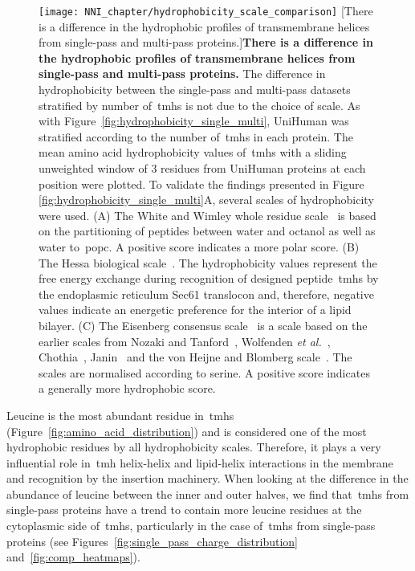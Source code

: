 \begin{figure}[!ht]
\centering
\texttt{[image: NNI\_chapter/hydrophobicity\_scale\_comparison]}
[There is a difference in the hydrophobic profiles of transmembrane helices from single\--pass and multi\--pass proteins.]{\textbf{There is a difference in the hydrophobic profiles of transmembrane helices from single\--pass and multi\--pass proteins.}
The difference in hydrophobicity between the single\--pass and multi\--pass datasets stratified by number of~\gls{tmh}s is not due to the choice of scale.
As with Figure~\ref{fig:hydrophobicity_single_multi}, UniHuman was stratified according to the number of~\gls{tmh}s in each protein.
The mean amino acid hydrophobicity values of~\gls{tmh}s with a sliding unweighted window of 3 residues from UniHuman proteins at each position were plotted.
To validate the findings presented in Figure \ref{fig:hydrophobicity_single_multi}A, several scales of hydrophobicity were used.
(A) The White and Wimley whole residue scale~\cite{White1999} is based on the partitioning of peptides between water and octanol as well as water to~\gls{popc}.
A positive score indicates a more polar score.
(B) The Hessa biological scale~\cite{Hessa2005}.
The hydrophobicity values represent the free energy exchange during recognition of designed peptide~\gls{tmh}s by the endoplasmic reticulum Sec61 translocon and, therefore, negative values indicate an energetic preference for the interior of a lipid bilayer.
(C) The Eisenberg consensus scale~\cite{Eisenberg1984} is a scale based on the earlier scales from Nozaki and Tanford~\cite{Nozaki1971}, Wolfenden \textit{et al.}~\cite{Wolfenden1981}, Chothia~\cite{Chothia1976}, Janin~\cite{Janin1979} and the von Heijne and Blomberg scale~\cite{VonHeijne1979}.
The scales are normalised according to serine.
A positive score indicates a generally more hydrophobic score.}

\label{fig:hydrophobicity_scale_comparison}
\end{figure}

Leucine is the most abundant residue in~\gls{tmh}s (Figure~\ref{fig:amino_acid_distribution}) and is considered one of the most hydrophobic residues by all hydrophobicity scales.
Therefore, it plays a very influential role in~\gls{tmh} helix-helix and lipid-helix interactions in the membrane and recognition by the insertion machinery.
When looking at the difference in the abundance of leucine between the inner and outer halves, we find that~\gls{tmh}s from single\--pass proteins have a trend to contain more leucine residues at the cytoplasmic side of~\gls{tmh}s, particularly in the case of~\gls{tmh}s from single\--pass proteins (see Figures~\ref{fig:single_pass_charge_distribution} and~\ref{fig:comp_heatmaps}).

